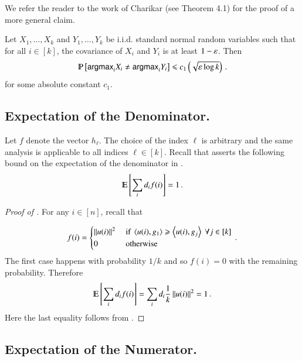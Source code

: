 \documentclass[11pt]{article}
\begin{document}
%
%
%
%
We refer the reader to the work of Charikar \etal \cite{cmm06a} (see
Theorem 4.1) for the proof of a more general claim.
\begin{fact}
\label{lem:2gauss}
Let $X_1, \ldots, X_k$ and $Y_1, \ldots, Y_k$ be i.i.d.
standard normal random variables such that for all $i \in [k]$, the covariance of $X_i$ and $Y_i$ is at least $1 - \varepsilon$.
Then \[ \Pr{ \argmax_i X_i \neq \argmax_i Y_i  }    \leq c_1 \left( 
	\sqrt{\e \log k}  \right) \mper  \]
for some absolute constant $c_1$.
\end{fact}
%
\subsection{Expectation of the Denominator.}
%
Let $f$ denote the vector $h_\ell$. The choice of the index $\ell$ is arbitrary and the same analysis
is applicable to all indices $\ell \in [k]$.
%
Recall that  asserts the following bound on the
expectation of the denominator in . 
\[\Ex{\sum_i d_i f(i)}  =1  \mper \]
\begin{proof}[Proof of ]
For any $i \in [n]$, recall that

\begin{equation} \label{eq:def-f}
f(i) = \begin{cases}
	\left\lVert u(i)\right\rVert^2 & \textrm{ if } \left\langle u(i),g_1\right\rangle \geqslant  \left\langle u(i),g_j\right\rangle\ \forall j \in [k] \\
	0 & \textrm{ otherwise} \end{cases} \,. 
\end{equation}
The first case happens with probability $1/k$ and so $f(i)=0$ with the
remaining probability.
Therefore
\[   \Ex{\sum_i d_i f(i)} = \sum_i d_i \frac{1}{k} \norm{u(i)}^2 = 1 \mper \]
Here the last equality follows from .
\end{proof}

\subsection{Expectation of the Numerator.}
\end{document}
